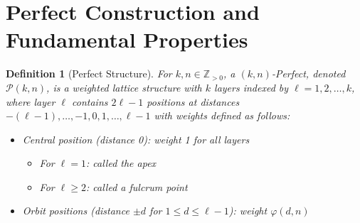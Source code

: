 \documentclass[11pt]{article}
\newcommand{\perfect}{\mathcal{P}}
\newtheorem{definition}{Definition}[section]
\begin{document}

\section{Perfect Construction and Fundamental Properties}\label{sec:construction}

\begin{definition}[Perfect Structure]\label{def:perfect-structure}
For $k,n \in \mathbb{Z}_{>0}$, a $(k,n)$-Perfect, denoted $\perfect(k,n)$, is a weighted lattice structure with $k$ layers indexed by $\ell = 1, 2, \ldots, k$, where layer $\ell$ contains $2\ell-1$ positions at distances $-(\ell-1), \ldots, -1, 0, 1, \ldots, \ell-1$ with weights defined as follows:
\begin{itemize}
    \item \emph{Central position} (distance 0): weight 1 for all layers
    \begin{itemize}
        \item For $\ell = 1$: called the \emph{apex}
        \item For $\ell \geq 2$: called a \emph{fulcrum} point
    \end{itemize}
    \item \emph{Orbit positions} (distance $\pm d$ for $1 \leq d \leq \ell-1$): weight $\varphi(d,n)$
\end{itemize}
\end{definition}
\end{document}
